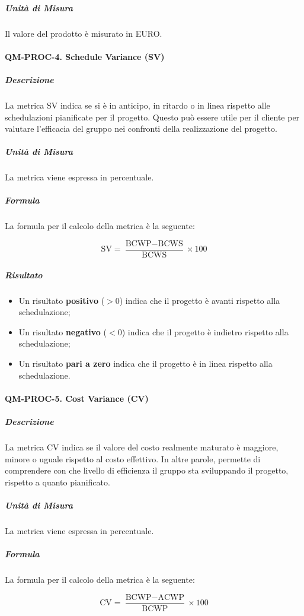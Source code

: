 				\subparagraph{Unità di Misura}
				Il valore del prodotto è misurato in EURO.

			\paragraph{QM-PROC-4. Schedule Variance (SV)}

				\subparagraph{Descrizione}
				La metrica SV indica se si è in anticipo, in ritardo o in linea rispetto alle schedulazioni pianificate per il progetto. Questo può essere utile per il cliente per valutare l'efficacia del gruppo nei confronti della realizzazione del progetto.

				\subparagraph{Unità di Misura}
				La metrica viene espressa in percentuale.

				\subparagraph{Formula}
				La formula per il calcolo della metrica è la seguente:

				\[
					\text{SV} = \frac{\text{BCWP} - \text{BCWS}}{\text{BCWS}} \times 100
				\]

				\subparagraph{Risultato}
				\begin{itemize}
					\item Un risultato \textbf{positivo} (\(> 0\)) indica che il progetto è avanti rispetto alla schedulazione;
					\item Un risultato \textbf{negativo} (\(< 0\)) indica che il progetto è indietro rispetto alla schedulazione;
					\item Un risultato \textbf{pari a zero} indica che il progetto è in linea rispetto alla schedulazione.
				\end{itemize}

			\paragraph{QM-PROC-5. Cost Variance (CV)}

				\subparagraph{Descrizione}
				La metrica CV indica se il valore del costo realmente maturato è maggiore, minore o uguale rispetto al costo effettivo. In altre parole, permette di comprendere con che livello di efficienza il gruppo sta sviluppando il progetto, rispetto a quanto pianificato.

				\subparagraph{Unità di Misura}
				La metrica viene espressa in percentuale.

				\subparagraph{Formula}
				La formula per il calcolo della metrica è la seguente:

				\[
					\text{CV} = \frac{\text{BCWP} - \text{ACWP}}{\text{BCWP}} \times 100
				\]

